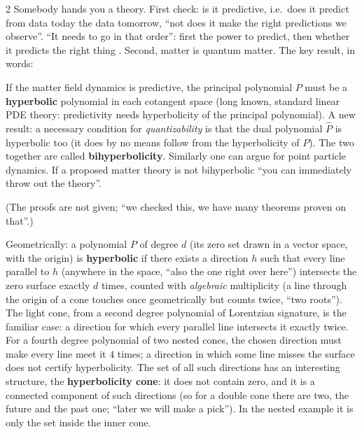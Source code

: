 \begin{paracol}{2}
Somebody hands you a theory. First check: is it predictive, i.e.\ does it predict from data today the data tomorrow, ``not does it make the right predictions we observe''. ``It needs to go in that order'': first the power to predict, then whether it predicts the right thing . Second, matter is quantum matter. The key result, in words:

\begin{theorem}\label{thm:c26-bihyp}
If the matter field dynamics is predictive, the principal polynomial $P$ must be a \textbf{hyperbolic} polynomial in each cotangent space (long known, standard linear PDE theory: predictivity needs hyperbolicity of the principal polynomial). A new result: a necessary condition for \emph{quantizability} is that the dual polynomial $\hat P$ is hyperbolic too (it does by no means follow from the hyperbolicity of $P$). The two together are called \textbf{bihyperbolicity}. Similarly one can argue for point particle dynamics. If a proposed matter theory is not bihyperbolic ``you can immediately throw out the theory''.
\end{theorem}

(The proofs are not given; ``we checked this, we have many theorems proven on that''.)

\begin{definition}\label{def:c26-hyp}
Geometrically: a polynomial $P$ of degree $d$ (its zero set drawn in a vector space, with the origin) is \textbf{hyperbolic} if there exists a direction $h$ such that every line parallel to $h$ (anywhere in the space, ``also the one right over here'') intersects the zero surface exactly $d$ times, counted with \emph{algebraic} multiplicity (a line through the origin of a cone touches once geometrically but counts twice, ``two roots''). The light cone, from a second degree polynomial of Lorentzian signature, is the familiar case: a direction for which every parallel line intersects it exactly twice. For a fourth degree polynomial of two nested cones, the chosen direction must make every line meet it $4$ times; a direction in which some line misses the surface does not certify hyperbolicity. The set of all such directions has an interesting structure, the \textbf{hyperbolicity cone}: it does not contain zero, and it is a connected component of such directions (so for a double cone there are two, the future and the past one; ``later we will make a pick''). In the nested example it is only the set inside the inner cone.
\end{definition}


\end{paracol}
